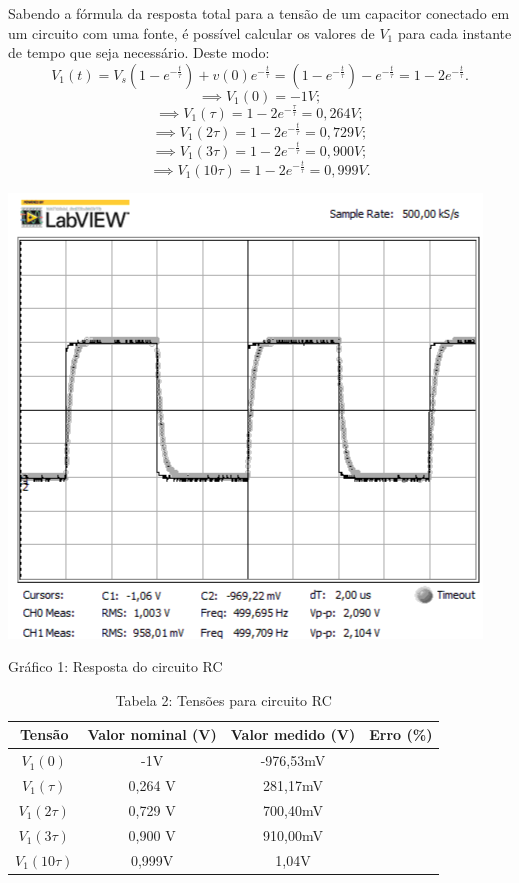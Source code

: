 \documentclass[a4 paper]{article}
\begin{document}
Sabendo a fórmula da resposta total para a tensão de um capacitor conectado em um circuito com uma fonte, é possível calcular os valores de $V_1$ para cada instante de tempo que seja necessário. Deste modo:
\[	V_1(t)=V_s(1-e^{-\frac{t}{\tau}})+v(0)e^{-\frac{t}{\tau}}=(1-e^{-\frac{t}{\tau}})-e^{-\frac{t}{\tau}}=1-2e^{-\frac{t}{\tau}}.\]
\[\implies V_1(0)= -1 V;\] 
\[\implies V_1(\tau)= 1-2e^{-\frac{\tau}{\tau}}=0,264 V;   \]
\[\implies V_1(2\tau)= 1-2e^{-\frac{t}{\tau}}=0,729 V; \]
\[\implies V_1(3\tau)= 1-2e^{-\frac{t}{\tau}}=0,900 V; \]
\[\implies V_1(10\tau)=1-2e^{-\frac{t}{\tau}}=0,999V.\]

\newpage
\begin{table}[h]
\centering
\includegraphics[scale=0.6]{rgadicoas/rgadicoa}
\end{table}

\begin{center}
Gráfico 1: Resposta do circuito RC
\end{center}



\vspace{5pt}
\begin{table}[h]
\centering
\begin{tabular}{|c|c|c|c|}
\hline
Tensão & Valor nominal (V) & Valor medido (V) & Erro (\%) \\\hline
$V_1(0)$ & -1V & -976,53mV & \\    \hline
$V_1(\tau)$ & 0,264 V & 281,17mV & \\    \hline
$V_1(2\tau)$ & 0,729 V & 700,40mV & \\\hline
$V_1(3\tau)$ & 0,900 V & 910,00mV & \\\hline
$V_1(10\tau)$ & 0,999V & 1,04V & \\\hline
\end{tabular}
\caption*{Tabela 2: Tensões para circuito RC}
\end{table}
\end{document}
